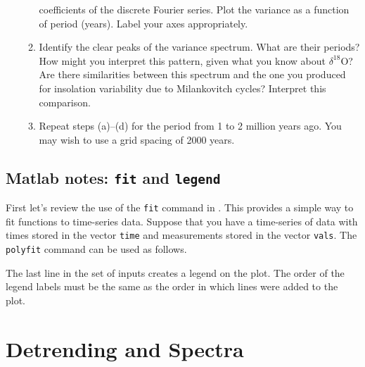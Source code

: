 \documentclass[12pt,twoside,a4paper]{article}
\begin{document}
\begin{enumerate}
\begin{enumerate}
    coefficients of the discrete Fourier series.  Plot the variance as
    a function of period (years). Label your axes appropriately.
  \item Identify the clear peaks of the variance spectrum.  What are
    their periods? How might you interpret this pattern, given what
    you know about $\delta^{18}$O? Are there similarities between this
    spectrum and the one you produced for insolation variability due
    to Milankovitch cycles?  Interpret this comparison.
  \item Repeat steps (a)--(d) for the period from 1 to 2 million years
    ago.  You may wish to use a grid spacing of 2000 years.
  \end{enumerate}
\end{enumerate}


\subsection*{Matlab notes: \texttt{fit} and \texttt{legend}}

First let's review the use of the \texttt{fit} command in \Mlab.  This
provides a simple way to fit functions to time-series data.  Suppose
that you have a time-series of data with times stored in the vector
\texttt{time} and measurements stored in the vector \texttt{vals}.
The \texttt{polyfit} command can be used as follows.       

The last line in the set of \Mlab inputs creates a legend on the
plot. The order of the legend labels must be the same as the order in
which lines were added to the plot.

\section{Detrending and Spectra}
\end{document}
